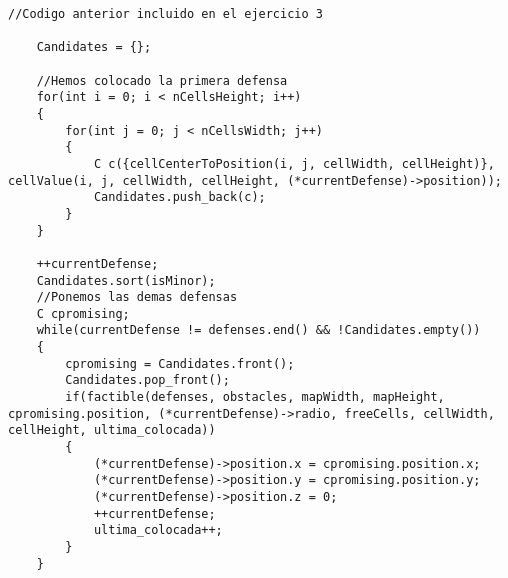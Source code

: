 \begin{lstlisting}
//Codigo anterior incluido en el ejercicio 3

    Candidates = {};

    //Hemos colocado la primera defensa
    for(int i = 0; i < nCellsHeight; i++)
    {
        for(int j = 0; j < nCellsWidth; j++)
        {
            C c({cellCenterToPosition(i, j, cellWidth, cellHeight)}, cellValue(i, j, cellWidth, cellHeight, (*currentDefense)->position));
            Candidates.push_back(c);
        }
    }

    ++currentDefense;
    Candidates.sort(isMinor);
    //Ponemos las demas defensas
    C cpromising;
    while(currentDefense != defenses.end() && !Candidates.empty())
    {
        cpromising = Candidates.front();
        Candidates.pop_front();
        if(factible(defenses, obstacles, mapWidth, mapHeight, cpromising.position, (*currentDefense)->radio, freeCells, cellWidth, cellHeight, ultima_colocada))
        {
            (*currentDefense)->position.x = cpromising.position.x;
            (*currentDefense)->position.y = cpromising.position.y;
            (*currentDefense)->position.z = 0;
            ++currentDefense;
            ultima_colocada++;
        }
    }
\end{lstlisting}